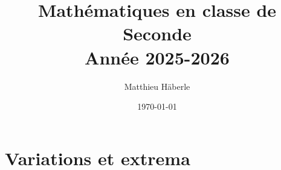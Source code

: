 \documentclass[a4paper, 12pt]{report}
\title{\Huge{Mathématiques en classe de Seconde}\\ Année 2025-2026}
\author{\huge{Matthieu Häberle}}
\date{\today}
\begin{document}
\maketitle
\newpage%
\tableofcontents
\pagebreak





























\chapter{Variations et extrema}


\end{document}
